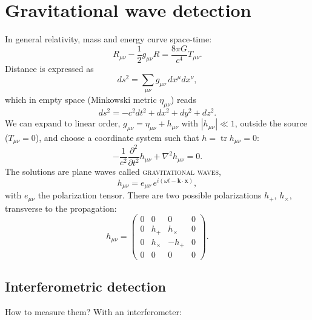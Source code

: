\documentclass[11pt,a4paper]{article}
\newcommand{\term}[1]{\textsc{#1}}
\begin{document}
\section{Gravitational wave detection}

In general relativity, mass and energy curve space-time:
\[
  R_{\mu\nu} - \frac12 g_{\mu\nu}R = \frac{8\pi G}{c^4}T_{\mu\nu}.
\]
Distance is expressed as
\[
  ds^2 = \sum_{\mu\nu} g_{\mu\nu}\,dx^\mu dx^\nu ,
\]
which in empty space (Minkowski metric $\eta_{\mu\nu}$) reads
\[
  ds^2 = -c^2dt^2+dx^2+dy^2+dz^2 .
\]
We can expand to linear order, $g_{\mu\nu}=\eta_{\mu\nu}+h_{\mu\nu}$ with $|h_{\mu\nu}|\ll1$, outside the source ($T_{\mu\nu}=0$), and choose a coordinate system such that $h=\operatorname{tr}h_{\mu\nu}=0$:
\[
  -\frac{1}{c^2}\frac{\partial^2}{\partial t^2}h_{\mu\nu} + \nabla^2 h_{\mu\nu} = 0 .
\]
The solutions are plane waves called \term{gravitational waves},
\[
  h_{\mu\nu} = e_{\mu\nu}\,e^{i(\omega t-\mathbf k\cdot\mathbf x)},
\]
with $e_{\mu\nu}$ the polarization tensor. There are two possible polarizations $h_+$, $h_\times$, transverse to the propagation:
\[
  h_{\mu\nu} = \begin{pmatrix} 0&0&0&0\\ 0&h_+&h_\times&0\\ 0&h_\times&-h_+&0\\ 0&0&0&0 \end{pmatrix}.
\]

\subsection{Interferometric detection}
How to measure them? With an interferometer:

\begin{center}
\end{center}
\end{document}
